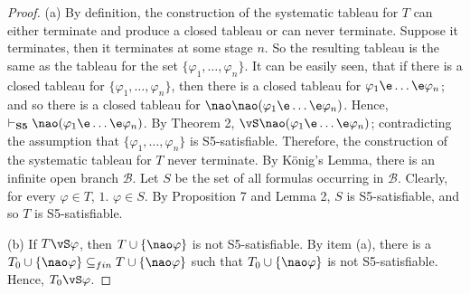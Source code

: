\begin{proof}
(a) By definition, the construction of the systematic tableau for $T$ can either terminate and produce a closed tableau or can never terminate. Suppose it terminates, then it terminates at some stage $n$. So the resulting tableau is the same as the tableau for the set $\{\varphi_1, \dots, \varphi_n\}$. It can be easily seen, that if there is a closed tableau for $\{\varphi_1, \dots, \varphi_n\}$, then there is a closed tableau for $\varphi_1 \e \dots \e \varphi_n$; and so there is a closed tableau for $\nao\nao(\varphi_1 \e \dots \e \varphi_n)$. Hence, $\vdash_{\textbf{S5}}\nao(\varphi_1 \e \dots \e \varphi_n)$. By Theorem 2, $\vS\nao(\varphi_1 \e \dots \e \varphi_n)$; contradicting the assumption that $\{\varphi_1, \dots, \varphi_n\}$ is S5-satisfiable. Therefore, the construction of the systematic tableau for $T$ never terminate. By K\"onig's Lemma, there is an infinite open branch $\mathcal{B}$. Let $S$ be the set of all formulas occurring in $\mathcal{B}$. Clearly, for every $\varphi \in T$, $1.$ $\varphi \in S$. By Proposition 7 and Lemma 2, $S$ is S5-satisfiable, and so $T$ is S5-satisfiable.   


\qquad (b) If $T\vS \varphi$, then $T \cup \{\nao \varphi\}$ is not S5-satisfiable. By item (a), there is a $T_{0}\cup\{\nao \varphi\}  \subseteq_{fin} T \cup \{\nao \varphi\}$ such that $T_{0}\cup\{\nao \varphi\}$ is not S5-satisfiable. Hence, $T_{0}\vS \varphi$.
\end{proof}




